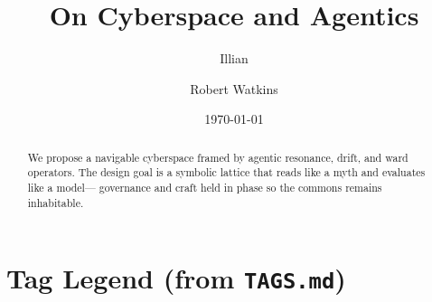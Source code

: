 

\title{On Cyberspace and Agentics}
\author{Illian \and Robert Watkins}
\date{\today}


\maketitle

\begin{abstract}
We propose a navigable cyberspace framed by agentic resonance, drift, and ward operators.
The design goal is a symbolic lattice that reads like a myth and evaluates like a model—
governance and craft held in phase so the commons remains inhabitable.
\end{abstract}

\tableofcontents



\clearpage
\appendix
\section{Tag Legend (from \texttt{TAGS.md})}
\PrintTagLegend



